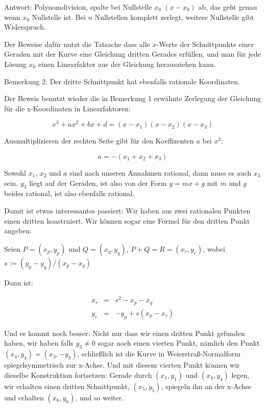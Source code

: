 \documentclass{article}
\begin{document}
Antwort: Polynomdivision, spalte bei Nullstelle $x_0$ $(x - x_0)$ ab, das
geht genau wenn $x_0$ Nullstelle ist. Bei $n$ Nullstellen komplett zerlegt,
weitere Nullstelle gibt Widerspruch.

Der Beweise dafür nutzt die Tatsache dass alle $x$-Werte der Schnittpunkte einer
Geraden mit der Kurve eine Gleichung dritten Gerades erfüllen, und man für
jede Lösung $x_0$ einen Linearfaktor aus der Gleichung herausziehen kann.

Bemerkung 2: Der dritte Schnittpunkt hat ebenfalls rationale Koordinaten.

Der Beweis benutzt wieder die in Bemerkung 1 erwähnte Zerlegung der Gleichung
für die x-Koordinaten in Linearfaktoren:

   $$ x^3 + a x^2 + b x + d = (x - x_1) (x - x_2) (x - x_3) $$

Ausmultiplizieren der rechten Seite gibt für den Koeffizenten $a$ bei $x^2$:

  $$ a = - (x_1 + x_2 + x_3) $$

Sowohl $x_1$, $x_2$ und $a$ sind nach unseren Annahmen rational, dann muss es
auch $x_3$ sein. $y_3$ liegt auf der Geraden, ist also von der Form
$y = mx + g$ mit $m$ und $g$ beides rational, ist also ebenfalls rational.
  
Damit ist etwas interessantes passiert: Wir haben aus zwei rationalen Punkten
einen dritten konstruiert. Wir können sogar eine Formel für den dritten Punkt
angeben:

Seien $P=(x_p, y_p)$ und $Q=(x_q, y_q)$, $P + Q = R = (x_r, y_r)$, wobei
$s := (y_p - y_q) / (x_p - x_q)$

Dann ist:

\begin{eqnarray*}
  x_r &=& s^2 - x_p - x_q \\
  y_r &=& - y_p + s (x_p - x_r)
\end{eqnarray*}

Und es kommt noch besser: Nicht nur dass wir einen dritten Punkt gefunden
haben, wir haben falls $y_3 \ne 0$ sogar noch einen vierten Punkt, nämlich den
Punkt $(x_4, y_4) = (x_3, -y_3)$, schließlich ist die Kurve in Weierstraß-Normalform
spiegelsymmetrisch zur x-Achse. Und mit diesem vierten Punkt können wir
dieselbe Konstruktion fortsetzen: Gerade durch $(x_1, y_1)$ und $(x_4, y_4)$
legen, wir erhalten einen dritten Schnittpunkt, $(x_5, y_5)$, spiegeln ihn an
der x-Achse und erhalten $(x_6, y_6)$, und so weiter.
\end{document}
